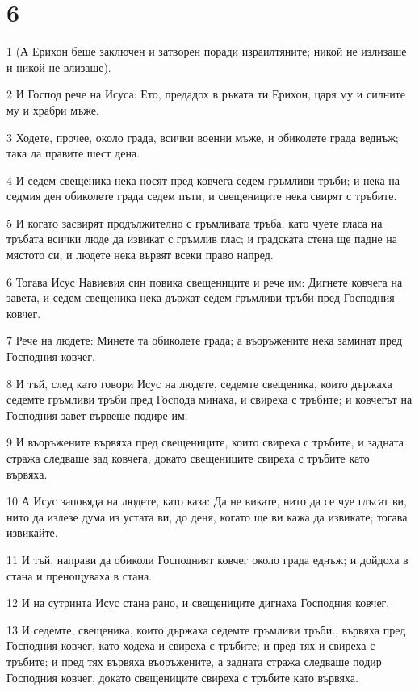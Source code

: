 \chapter{6}

\par 1 (А Ерихон беше заключен и затворен поради израилтяните; никой не излизаше и никой не влизаше).
\par 2 И Господ рече на Исуса: Ето, предадох в ръката ти Ерихон, царя му и силните му и храбри мъже.
\par 3 Ходете, прочее, около града, всички военни мъже, и обиколете града веднъж; така да правите шест дена.
\par 4 И седем свещеника нека носят пред ковчега седем гръмливи тръби; и нека на седмия ден обиколете града седем пъти, и свещениците нека свирят с тръбите.
\par 5 И когато засвирят продължително с гръмливата тръба, като чуете гласа на тръбата всички люде да извикат с гръмлив глас; и градската стена ще падне на мястото си, и людете нека вървят всеки право напред.
\par 6 Тогава Исус Навиевия син повика свещениците и рече им: Дигнете ковчега на завета, и седем свещеника нека държат седем гръмливи тръби пред Господния ковчег.
\par 7 Рече на людете: Минете та обиколете града; а въоръжените нека заминат пред Господния ковчег.
\par 8 И тъй, след като говори Исус на людете, седемте свещеника, които държаха седемте гръмливи тръби пред Господа минаха, и свиреха с тръбите; и ковчегът на Господния завет вървеше подире им.
\par 9 И въоръжените вървяха пред свещениците, които свиреха с тръбите, и задната стража следваше зад ковчега, докато свещениците свиреха с тръбите като вървяха.
\par 10 А Исус заповяда на людете, като каза: Да не викате, нито да се чуе глъсат ви, нито да излезе дума из устата ви, до деня, когато ще ви кажа да извикате; тогава извикайте.
\par 11 И тъй, направи да обиколи Господният ковчег около града еднъж; и дойдоха в стана и пренощуваха в стана.
\par 12 И на сутринта Исус стана рано, и свещениците дигнаха Господния ковчег,
\par 13 И седемте, свещеника, които държаха седемте гръмливи тръби., вървяха пред Господния ковчег, като ходеха и свиреха с тръбите; и пред тях и свиреха с тръбите; и пред тях вървяха въоръжените, а задната стража следваше подир Господния ковчег, докато свещениците свиреха с тръбите като вървяха.
